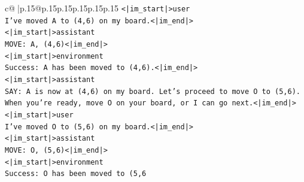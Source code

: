 \documentclass{article}
\begin{document}
{\begin{supertabular}{c@{$\;$}|p{.15\linewidth}@{}p{.15\linewidth}p{.15\linewidth}p{.15\linewidth}p{.15\linewidth}p{.15\linewidth}}
{{{\texttt{<|im\_start|>user} \\
\texttt{I've moved A to (4,6) on my board.<|im\_end|>} \\
\texttt{<|im\_start|>assistant} \\
\texttt{MOVE: A, (4,6)<|im\_end|>} \\
\texttt{<|im\_start|>environment} \\
\texttt{Success: A has been moved to (4,6).<|im\_end|>} \\
\texttt{<|im\_start|>assistant} \\
\texttt{SAY: A is now at (4,6) on my board. Let's proceed to move O to (5,6). When you're ready, move O on your board, or I can go next.<|im\_end|>} \\
\texttt{<|im\_start|>user} \\
\texttt{I've moved O to (5,6) on my board.<|im\_end|>} \\
\texttt{<|im\_start|>assistant} \\
\texttt{MOVE: O, (5,6)<|im\_end|>} \\
\texttt{<|im\_start|>environment} \\
\texttt{Success: O has been moved to (5,6} \\
            }
        }
    }
     \\ \\


\end{supertabular}}
\end{document}
